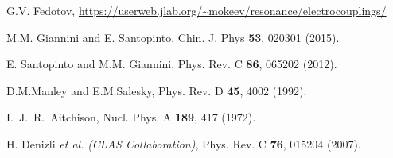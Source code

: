 \begin{thebibliography}{999}
G.V. Fedotov, 
\url{https://userweb.jlab.org/~mokeev/resonance/electrocouplings/}  

M.M. Giannini and E. Santopinto, Chin. J. Phys {\bf 53}, 020301 (2015).

E. Santopinto and M.M. Giannini, Phys. Rev. C {\bf 86}, 065202 (2012).

D.M.Manley and E.M.Salesky, Phys. Rev. D {\bf 45}, 4002 (1992).

I.~J.~R.~Aitchison,  Nucl. Phys. A {\bf 189}, 417 (1972).

H. Denizli  {\it et al.} {\it (CLAS Collaboration)}, Phys. Rev. C {\bf 76}, 015204 (2007).

\end{thebibliography}